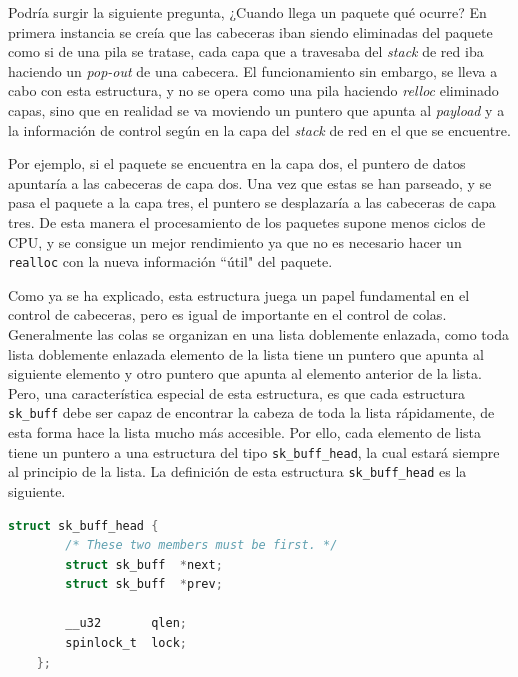  Podría surgir la siguiente pregunta, ¿Cuando llega un paquete qué ocurre? En primera instancia se creía que las cabeceras iban siendo eliminadas del paquete como si de una pila se tratase, cada capa que a travesaba del \textit{stack} de red iba haciendo un \textit{pop-out} de una cabecera. El funcionamiento sin embargo, se lleva a cabo con esta estructura, y no se opera como una pila haciendo \textit{relloc} eliminado capas, sino que en realidad se va moviendo un puntero que apunta al \textit{payload} y  a la información de control según en la capa del \textit{stack} de red en el que se encuentre.\\
\par

Por ejemplo, si el paquete se encuentra en  la capa dos, el puntero de datos apuntaría a las cabeceras de capa dos. Una vez que estas se han parseado, y se pasa el paquete a la capa tres, el puntero se desplazaría a las cabeceras de capa tres. De esta manera el procesamiento de los paquetes supone menos ciclos de CPU, y se consigue un mejor rendimiento ya que no es necesario hacer un \texttt{realloc} con la nueva información ``útil" del paquete.\\
\par


Como ya se ha explicado, esta estructura juega un papel fundamental en el control de cabeceras, pero es igual de importante en el control de colas. Generalmente las colas se organizan en una lista doblemente enlazada, como toda lista doblemente enlazada elemento de la lista tiene un puntero que apunta al siguiente elemento y otro puntero que apunta al elemento anterior de la lista. Pero, una característica especial de esta estructura, es que cada estructura \texttt{sk\_buff} debe ser capaz de encontrar la cabeza de toda la lista rápidamente, de esta forma hace la lista mucho más accesible. Por ello, cada elemento de lista tiene un puntero a una estructura del tipo \texttt{sk\_buff\_head}, la cual estará siempre al principio de la lista. La definición de esta estructura \texttt{sk\_buff\_head} es la siguiente.

\begin{lstlisting}[language=C, style=C-color, caption={Estructura sk\_buff\_head},label=code:linuxNet_skbuffhead]
    struct sk_buff_head {
    	/* These two members must be first. */
    	struct sk_buff	*next;
    	struct sk_buff	*prev;
    
    	__u32		qlen;
    	spinlock_t	lock;
    };
\end{lstlisting}
\vspace{0.5cm}

